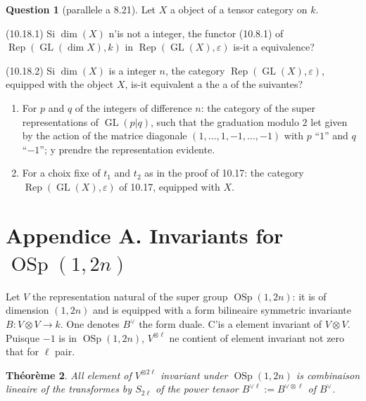\documentclass[11pt,a4paper]{article}
\theoremstyle{plain}
\newtheorem{theorem}{Th\'eor\`eme}[section]
\theoremstyle{definition}
\newtheorem{question}[theorem]{Question}
\DeclareMathOperator{\Rep}{Rep}
\DeclareMathOperator{\GL}{GL}
\DeclareMathOperator{\OSp}{OSp}
\newcommand{\eps}{\varepsilon}
\begin{document}
\begin{question}[parallele a 8.21]
Let $X$ a object of a tensor category on $k$.

\textup{(10.18.1)} Si $\dim(X)$ n'is not a integer, the functor (10.8.1) of $\Rep(\GL(\dim X), k)$ in $\Rep(\GL(X), \eps)$ is-it a equivalence?

\textup{(10.18.2)} Si $\dim(X)$ is a integer $n$, the category $\Rep(\GL(X), \eps)$, equipped with the object $X$, is-it equivalent a the a of the suivantes?
\begin{enumerate}[label=(\alph*)]
\item For $p$ and $q$ of the integers of difference $n$: the category of the super representations of $\GL(p|q)$, such that the graduation modulo $2$ let given by the action of the matrice diagonale $(1, \ldots, 1, -1, \ldots, -1)$ with $p$ ``$1$'' and $q$ ``$-1$''; y prendre the representation evidente.
\item For a choix fixe of $t_1$ and $t_2$ as in the proof of 10.17: the category $\Rep(\GL(X), \eps)$ of 10.17, equipped with $X$.
\end{enumerate}
\end{question}


\section*{Appendice A. Invariants for $\OSp(1, 2n)$}

Let $V$ the representation natural of the super group $\OSp(1, 2n)$: it is of dimension $(1, 2n)$ and is equipped with a form bilineaire symmetric invariante $B : V \otimes V \to k$. One denotes $B^\vee$ the form duale. C'is a element invariant of $V \otimes V$. Puisque $-1$ is in $\OSp(1, 2n)$, $V^{\otimes \ell}$ ne contient of element invariant not zero that for $\ell$ pair.

\begin{theorem}
All element of $V^{\otimes 2\ell}$ invariant under $\OSp(1, 2n)$ is combinaison lineaire of the transformes by $S_{2\ell}$ of the power tensor $B^{\vee \ell} := B^{\vee \otimes \ell}$ of $B^\vee$.
\end{theorem}
\end{document}
